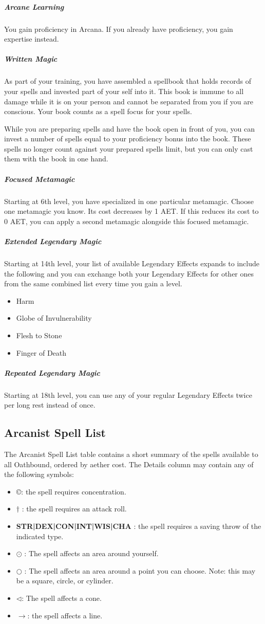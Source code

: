 \subparagraph*{Arcane Learning}
You gain proficiency in Arcana. If you already have proficiency, you gain expertise instead.

\subparagraph*{Written Magic}
As part of your training, you have assembled a spellbook that holds records of your spells and invested part of your self into it. This book is immune to all damage while it is on your person and cannot be separated from you if you are conscious. Your book counts as a spell focus for your spells.

While you are preparing spells and have the book open in front of you, you can invest a number of spells equal to your proficiency bonus into the book. These spells no longer count against your prepared spells limit, but you can only cast them with the book in one hand.

\subparagraph*{Focused Metamagic}
Starting at 6th level, you have specialized in one particular metamagic. Choose one metamagic you know. Its cost decreases by 1 AET. If this reduces its cost to 0 AET, you can apply a second metamagic alongside this focused metamagic.

\subparagraph*{Extended Legendary Magic}
Starting at 14th level, your list of available Legendary Effects expands to include the following and you can exchange both your Legendary Effects for other ones from the same combined list every time you gain a level.

\begin{itemize}
  \item Harm
  \item Globe of Invulnerability
  \item Flesh to Stone
  \item Finger of Death
\end{itemize}

\subparagraph*{Repeated Legendary Magic}
Starting at 18th level, you can use any of your regular Legendary Effects twice per long rest instead of once.

\subsection{Arcanist Spell List}
The Arcanist Spell List table contains a short summary of the spells available to all Oathbound, ordered by aether cost. The Details column may contain any of the following symbols:
\begin{itemize}
	\item \copyright : the spell requires concentration.
	\item $\dagger$ : the spell requires an attack roll.
	\item \textbf{STR|DEX|CON|INT|WIS|CHA} : the spell requires a saving throw of the indicated type.
	\item $\odot$ : The spell affects an area around yourself.
	\item $\bigcirc$ : The spell affects an area around a point you can choose. Note: this may be a square, circle, or cylinder.
	\item $\triangleleft$: The spell affects a cone.
	\item $\rightarrow$: the spell affects a line.
\end{itemize}

